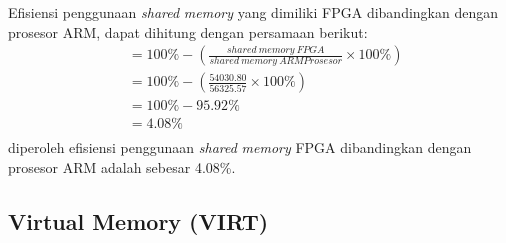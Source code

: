 Efisiensi penggunaan \textit{shared} \textit{memory} yang dimiliki FPGA dibandingkan dengan prosesor ARM, dapat dihitung dengan persamaan berikut:
\begin{equation*}
    \begin{split}
& = 100\% - \left( \frac{shared\ memory\ FPGA}{shared\ memory\ ARM Prosesor} \times 100\% \right) \\
& = 100\% - \left( \frac{54030.80}{56325.57} \times 100\% \right) \\
& = 100\% - 95.92\% \\
& = 4.08\% \\
    \end{split}
\end{equation*}
diperoleh efisiensi penggunaan \textit{shared} \textit{memory} FPGA dibandingkan dengan prosesor ARM adalah sebesar 4.08\%.

\subsection{Virtual Memory (VIRT)}


